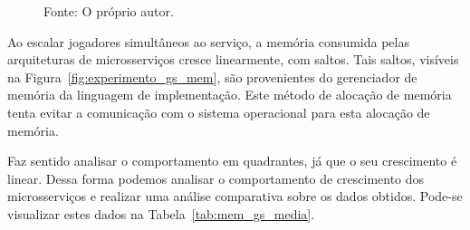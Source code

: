 \begin{figure}[htb!]
    Fonte: O próprio autor.
\end{figure}

Ao escalar jogadores simultâneos ao serviço, a memória consumida pelas arquiteturas de microsserviços cresce linearmente, com saltos.
%
Tais saltos, visíveis na Figura~\ref{fig:experimento_gs_mem}, são provenientes do gerenciador de memória da linguagem de implementação.
%
Este método de alocação de memória tenta evitar a comunicação com o sistema operacional para esta alocação de memória.


Faz sentido analisar o comportamento em quadrantes, já que o seu crescimento é linear.
%
Dessa forma podemos analisar o comportamento de crescimento dos microsserviços e realizar uma análise comparativa sobre os dados obtidos.
%
Pode-se visualizar estes dados na Tabela~\ref{tab:mem_gs_media}.

